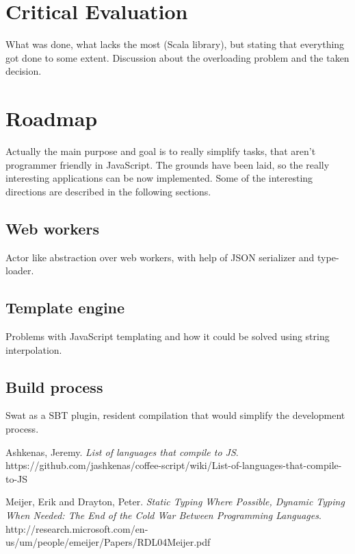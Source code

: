 \documentclass[12pt,a4paper]{report}
\begin{document}
\section{Critical Evaluation}

What was done, what lacks the most (Scala library), but stating that everything got done to some extent. Discussion about the overloading problem and the taken decision.

\section{Roadmap}

Actually the main purpose and goal is to really simplify tasks, that aren't programmer friendly in JavaScript. The grounds have been laid, so the really interesting applications can be now implemented. Some of the interesting directions are described in the following sections.

\subsection{Web workers}

Actor like abstraction over web workers, with help of JSON serializer and type-loader.

\subsection{Template engine}

Problems with JavaScript templating and how it could be solved using string interpolation.

\subsection{Build process}

Swat as a SBT plugin, resident compilation that would simplify the development process.



\def\bibname{Bibliography}
\begin{thebibliography}{99}
\addcontentsline{toc}{chapter}{\bibname}

  {\sc Ashkenas,} Jeremy.
  \emph{List of languages that compile to JS}.
  https://github.com/jashkenas/coffee-script/wiki/List-of-languages-that-compile-to-JS
	
	{\sc Meijer,} Erik and {\sc Drayton,} Peter.
	\emph{Static Typing Where Possible, Dynamic Typing When Needed: The End of the Cold War Between Programming Languages}.
	http://research.microsoft.com/en-us/um/people/emeijer/Papers/RDL04Meijer.pdf

\end{thebibliography}
\end{document}
